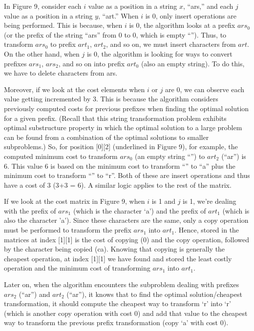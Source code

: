 \documentclass[12pt,letterpaper]{article}
\begin{document}
In Figure 9, consider each $i$ value as a position in a string $x$, “ars,”  and each $j$ value as a position in a string $y$, “art.” When $i$ is 0, only insert operations are being performed. This is because, when $i$ is 0, the algorithm looks at a prefix $ars_0$ (or the prefix of the string “ars” from 0 to 0, which is empty “”). Thus, to transform $ars_0$ to prefix $art_1$, $art_2$, and so on, we must insert characters from $art$. On the other hand, when $j$ is 0, the algorithm is looking for ways to convert prefixes $ars_1$, $ars_2$, and so on into prefix $art_0$ (also an empty string). To do this, we have to delete characters from ars.

Moreover, if we look at the cost elements when $i$ or $j$ are 0, we can observe each value getting incremented by 3. This is because the algorithm considers previously computed costs for previous prefixes when finding the optimal solution for a given prefix. (Recall that this string transformation problem exhibits optimal substructure property in which the optimal solution to a large problem can be found from a combination of the optimal solutions to smaller subproblems.) So, for position [0][2] (underlined in Figure 9), for example, the computed minimum cost to transform $ars_0$ (an empty string “”) to $art_2$ (“ar”) is 6. This value 6 is based on the minimum cost to transform “” to “a” plus the minimum cost to transform “” to “r”. Both of these are insert operations and thus have a cost of 3 (3+3 = 6). A similar logic applies to the rest of the matrix.

If we look at the cost matrix in Figure 9, when $i$ is 1 and $j$ is 1, we’re dealing with the prefix of $ars_1$ (which is the character ‘a’) and the prefix of $art_1$ (which is also the character ’a’). Since these characters are the same, only a copy operation must be performed to transform the prefix $ars_1$ into $art_1$. Hence, stored in the matrices at index [1][1] is the cost of copying (0) and the copy operation, followed by the character being copied (ca). Knowing that copying is generally the cheapest operation, at index [1][1] we have found and stored the least costly operation and the minimum cost of transforming $ars_1$ into $art_1$. 

Later on, when the algorithm encounters the subproblem dealing with prefixes $ars_2$ (“ar”) and $art_2$ (“ar”), it knows that to find the optimal solution/cheapest transformation, it should compute the cheapest way to transform ‘r’ into ‘r’ (which is another copy operation with cost 0) and add that value to the cheapest way to transform the previous prefix transformation (copy ‘a’ with cost 0).
\end{document}
